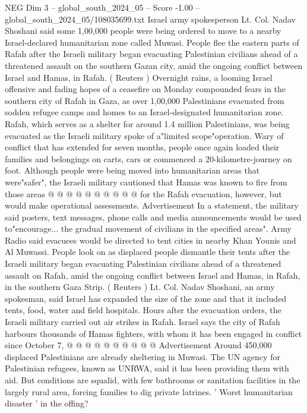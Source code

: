 \begin{textsample}{NEG Dim 3 – global\_south\_2024\_05 – Score -1.00 – global\_south\_2024\_05/108035699.txt}  \label{ex:f3_neg_367}
Israel army spokesperson Lt.
Col.
Nadav Shoshani said some 1,00,000 people were being ordered to move to a nearby Israel-declared humanitarian zone called Muwasi.
People flee the eastern parts of Rafah after the Israeli military began evacuating Palestinian civilians ahead of a threatened assault on the southern Gazan city, amid the ongoing conflict between Israel and Hamas, in Rafah. ( Reuters ) Overnight rains, a looming Israel offensive and fading hopes of a ceasefire on Monday compounded fears in the southern city of Rafah in Gaza, as over 1,00,000 Palestinians evacuated from sodden refugee camps and homes to an Israel-designated humanitarian zone.
Rafah, which serves as a shelter for around 1.4 million Palestinians, was being evacuated as the Israeli military spoke of a"limited scope"operation.
Wary of conflict that has extended for seven months, people once again loaded their families and belongings on carts, cars or commenced a 20-kilometre-journey on foot.
Although people were being moved into humanitarian areas that were"safer", the Israeli military cautioned that Hamas was known to fire from those areas @ @ @ @ @ @ @ @ @ @ for the Rafah evacuation, however, but would make operational assessments.
Advertisement In a statement, the military said posters, text messages, phone calls and media announcements would be used to"encourage... the gradual movement of civilians in the specified areas".
Army Radio said evacuees would be directed to tent cities in nearby Khan Younis and Al Muwassi.
People look on as displaced people dismantle their tents after the Israeli military began evacuating Palestinian civilians ahead of a threatened assault on Rafah, amid the ongoing conflict between Israel and Hamas, in Rafah, in the southern Gaza Strip. ( Reuters ) Lt.
Col.
Nadav Shoshani, an army spokesman, said Israel has expanded the size of the zone and that it included tents, food, water and field hospitals.
Hours after the evacuation orders, the Israeli military carried out air strikes in Rafah.
Israel says the city of Rafah harbours thousands of Hamas fighters, with whom it has been engaged in conflict since October 7, @ @ @ @ @ @ @ @ @ @ Advertisement Around 450,000 displaced Palestinians are already sheltering in Muwasi.
The UN agency for Palestinian refugees, known as UNRWA, said it has been providing them with aid.
But conditions are squalid, with few bathrooms or sanitation facilities in the largely rural area, forcing families to dig private latrines. ' Worst humanitarian disaster ' in the offing?

\end{textsample}
